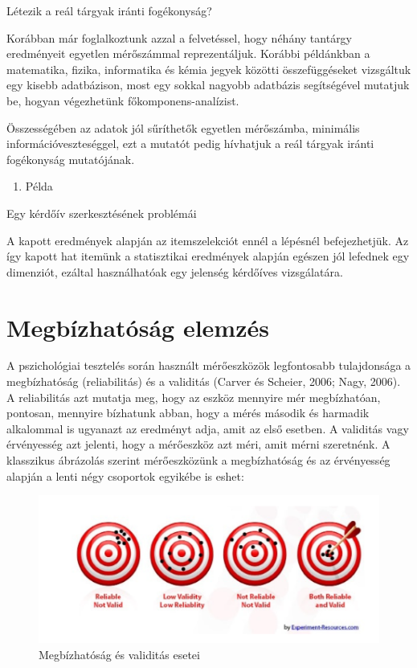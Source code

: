 \documentclass[
  letterpaper,
]{krantz}
\providecommand{\tightlist}{%
  \setlength{\itemsep}{0pt}\setlength{\parskip}{0pt}}\usepackage{longtable,booktabs,array}
\begin{document}
Létezik a reál tárgyak iránti fogékonyság?

Korábban már foglalkoztunk azzal a felvetéssel, hogy néhány tantárgy
eredményeit egyetlen mérőszámmal reprezentáljuk. Korábbi példánkban a
matematika, fizika, informatika és kémia jegyek közötti összefüggéseket
vizsgáltuk egy kisebb adatbázison, most egy sokkal nagyobb adatbázis
segítségével mutatjuk be, hogyan végezhetünk főkomponens-analízist.

Összességében az adatok jól sűríthetők egyetlen mérőszámba, minimális
információveszteséggel, ezt a mutatót pedig hívhatjuk a reál tárgyak
iránti fogékonyság mutatójának.

\begin{enumerate}
\def\labelenumi{\arabic{enumi}.}
\setcounter{enumi}{2}
\tightlist
\item
  Példa
\end{enumerate}

Egy kérdőív szerkesztésének problémái

A kapott eredmények alapján az itemszelekciót ennél a lépésnél
befejezhetjük. Az így kapott hat itemünk a statisztikai eredmények
alapján egészen jól lefednek egy dimenziót, ezáltal használhatóak egy
jelenség kérdőíves vizsgálatára.


\hypertarget{sec-megbizhatosag-elemzes}{%
\chapter{Megbízhatóság elemzés}\label{sec-megbizhatosag-elemzes}}

A pszichológiai tesztelés során használt mérőeszközök legfontosabb
tulajdonsága a megbízhatóság (reliabilitás) és a validitás (Carver és
Scheier, 2006; Nagy, 2006). A reliabilitás azt mutatja meg, hogy az
eszköz mennyire mér megbízhatóan, pontosan, mennyire bízhatunk abban,
hogy a mérés második és harmadik alkalommal is ugyanazt az eredményt
adja, amit az első esetben. A validitás vagy érvényesség azt jelenti,
hogy a mérőeszköz azt méri, amit mérni szeretnénk. A klasszikus
ábrázolás szerint mérőeszközünk a megbízhatóság és az érvényesség
alapján a lenti négy csoportok egyikébe is eshet:

\begin{figure}

{\centering \includegraphics{./images/megbizhatosag_kep_01.png}

}

\caption{Megbízhatóság és validitás esetei}

\end{figure}
\end{document}
